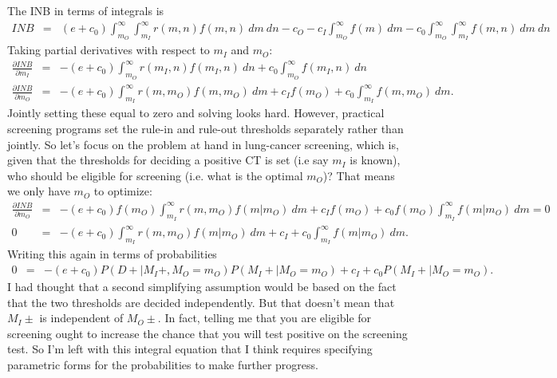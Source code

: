 \documentclass[11pt]{article}
\begin{document}
The INB in terms of integrals is
\begin{eqnarray*}
INB &=& (e+c_0)\int_{m_O}^{\infty}\int_{m_I}^{\infty} r(m,n)f(m,n)~dm~dn - c_O - c_I\int_{m_O}^{\infty} f(m)~dm - c_0\int_{m_O}^{\infty}\int_{m_I}^{\infty} f(m,n)~dm~dn
\end{eqnarray*}
Taking partial derivatives with respect to $m_I$ and $m_O$:
\begin{eqnarray*}
\frac{\partial INB}{\partial m_I} &=& -(e+c_0)\int_{m_O}^{\infty} r(m_I,n)f(m_I,n)~dn + c_0\int_{m_O}^{\infty} f(m_I,n)~dn\\
\frac{\partial INB}{\partial m_O} &=& -(e+c_0)\int_{m_I}^{\infty} r(m,m_O)f(m,m_O)~dm + c_If(m_O) + c_0\int_{m_I}^{\infty} f(m,m_O)~dm.
\end{eqnarray*}
Jointly setting these equal to zero and solving looks hard.  However, practical screening programs set the rule-in and rule-out thresholds separately rather than jointly.  So let's focus on the problem at hand in lung-cancer screening, which is, given that the thresholds for deciding a positive CT is set (i.e say $m_I$ is known), who should be eligible for screening (i.e. what is the optimal $m_O$)?  That means we only have $m_O$ to optimize:  
\begin{eqnarray*}
\frac{\partial INB}{\partial m_O} &=& -(e+c_0)f(m_O)\int_{m_I}^{\infty} r(m,m_O)f(m|m_O)~dm + c_If(m_O) + c_0f(m_O)\int_{m_I}^{\infty} f(m|m_O)~dm = 0\\
0 &=& -(e+c_0)\int_{m_I}^{\infty} r(m,m_O)f(m|m_O)~dm + c_I + c_0\int_{m_I}^{\infty} f(m|m_O)~dm.
\end{eqnarray*}
Writing this again in terms of probabilities
\begin{eqnarray*}
0 &=& -(e+c_0)P(D+|M_I+,M_O=m_O)P(M_I+|M_O=m_O) + c_I + c_0P(M_I+|M_O=m_O).
\end{eqnarray*}
I had thought that a second simplifying assumption would be based on the fact that the two thresholds are decided independently.  But that doesn't mean that $M_I\pm$ is independent of $M_O\pm$.  In fact, telling me that you are eligible for screening ought to increase the chance that you will test positive on the screening test.  So I'm left with this integral equation that I think requires specifying parametric forms for the probabilities to make further progress.
\end{document}
